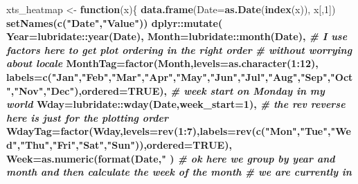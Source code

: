 \documentclass[]{krantz}
\makeatletter
\newenvironment{Shaded}{\begin{snugshade}}{\end{snugshade}}
\newcommand{\KeywordTok}[1]{\textcolor[rgb]{0.13,0.29,0.53}{\textbf{#1}}}
\newcommand{\DataTypeTok}[1]{\textcolor[rgb]{0.13,0.29,0.53}{#1}}
\newcommand{\DecValTok}[1]{\textcolor[rgb]{0.00,0.00,0.81}{#1}}
\newcommand{\StringTok}[1]{\textcolor[rgb]{0.31,0.60,0.02}{#1}}
\newcommand{\CommentTok}[1]{\textcolor[rgb]{0.56,0.35,0.01}{\textit{#1}}}
\newcommand{\OtherTok}[1]{\textcolor[rgb]{0.56,0.35,0.01}{#1}}
\newcommand{\ControlFlowTok}[1]{\textcolor[rgb]{0.13,0.29,0.53}{\textbf{#1}}}
\newcommand{\OperatorTok}[1]{\textcolor[rgb]{0.81,0.36,0.00}{\textbf{#1}}}
\newcommand{\NormalTok}[1]{#1}
\newenvironment{kframe}{%
\medskip{}
\setlength{\fboxsep}{.8em}
 \def\at@end@of@kframe{}%
 \ifinner\ifhmode%
  \def\at@end@of@kframe{\end{minipage}}%
  \begin{minipage}{\columnwidth}%
 \fi\fi%
 \def\FrameCommand##1{\hskip\@totalleftmargin \hskip-\fboxsep
 \colorbox{shadecolor}{##1}\hskip-\fboxsep
     \hskip-\linewidth \hskip-\@totalleftmargin \hskip\columnwidth}%
 \MakeFramed {\advance\hsize-\width
   \@totalleftmargin\z@ \linewidth\hsize
   \@setminipage}}%
 {\par\unskip\endMakeFramed%
 \at@end@of@kframe}
\renewenvironment{Shaded}{\begin{kframe}}{\end{kframe}}
\theoremstyle{definition}
\theoremstyle{definition}
\theoremstyle{definition}
\theoremstyle{remark}
\makeatother
\begin{document}
\begin{Shaded}
\begin{Highlighting}[]
\NormalTok{xts_heatmap <-}\StringTok{ }\ControlFlowTok{function}\NormalTok{(x)\{}
  \KeywordTok{data.frame}\NormalTok{(}\DataTypeTok{Date=}\KeywordTok{as.Date}\NormalTok{(}\KeywordTok{index}\NormalTok{(x)), x[,}\DecValTok{1}\NormalTok{]) }\OperatorTok{%
\StringTok{    }\KeywordTok{setNames}\NormalTok{(}\KeywordTok{c}\NormalTok{(}\StringTok{"Date"}\NormalTok{,}\StringTok{"Value"}\NormalTok{)) }\OperatorTok{%
\StringTok{    }\NormalTok{dplyr}\OperatorTok{::}\KeywordTok{mutate}\NormalTok{(}
      \DataTypeTok{Year=}\NormalTok{lubridate}\OperatorTok{::}\KeywordTok{year}\NormalTok{(Date),}
      \DataTypeTok{Month=}\NormalTok{lubridate}\OperatorTok{::}\KeywordTok{month}\NormalTok{(Date),}
      \CommentTok{# I use factors here to get plot ordering in the right order}
      \CommentTok{# without worrying about locale}
      \DataTypeTok{MonthTag=}\KeywordTok{factor}\NormalTok{(Month,}\DataTypeTok{levels=}\KeywordTok{as.character}\NormalTok{(}\DecValTok{1}\OperatorTok{:}\DecValTok{12}\NormalTok{),}
                      \DataTypeTok{labels=}\KeywordTok{c}\NormalTok{(}\StringTok{"Jan"}\NormalTok{,}\StringTok{"Feb"}\NormalTok{,}\StringTok{"Mar"}\NormalTok{,}\StringTok{"Apr"}\NormalTok{,}\StringTok{"May"}\NormalTok{,}\StringTok{"Jun"}\NormalTok{,}\StringTok{"Jul"}\NormalTok{,}\StringTok{"Aug"}\NormalTok{,}\StringTok{"Sep"}\NormalTok{,}\StringTok{"Oct"}\NormalTok{,}\StringTok{"Nov"}\NormalTok{,}\StringTok{"Dec"}\NormalTok{),}\DataTypeTok{ordered=}\OtherTok{TRUE}\NormalTok{),}
      \CommentTok{# week start on Monday in my world}
      \DataTypeTok{Wday=}\NormalTok{lubridate}\OperatorTok{::}\KeywordTok{wday}\NormalTok{(Date,}\DataTypeTok{week_start=}\DecValTok{1}\NormalTok{),}
      \CommentTok{# the rev reverse here is just for the plotting order}
      \DataTypeTok{WdayTag=}\KeywordTok{factor}\NormalTok{(Wday,}\DataTypeTok{levels=}\KeywordTok{rev}\NormalTok{(}\DecValTok{1}\OperatorTok{:}\DecValTok{7}\NormalTok{),}\DataTypeTok{labels=}\KeywordTok{rev}\NormalTok{(}\KeywordTok{c}\NormalTok{(}\StringTok{"Mon"}\NormalTok{,}\StringTok{"Tue"}\NormalTok{,}\StringTok{"Wed"}\NormalTok{,}\StringTok{"Thu"}\NormalTok{,}\StringTok{"Fri"}\NormalTok{,}\StringTok{"Sat"}\NormalTok{,}\StringTok{"Sun"}\NormalTok{)),}\DataTypeTok{ordered=}\OtherTok{TRUE}\NormalTok{),}
      \DataTypeTok{Week=}\KeywordTok{as.numeric}\NormalTok{(}\KeywordTok{format}\NormalTok{(Date,}\StringTok{"%
\NormalTok{    ) }\OperatorTok{%
\StringTok{    }\CommentTok{# ok here we group by year and month and then calculate the week of the month }
\StringTok{    }\CommentTok{# we are currently in}
}}}}
\end{Highlighting}
\end{Shaded}
\end{document}
